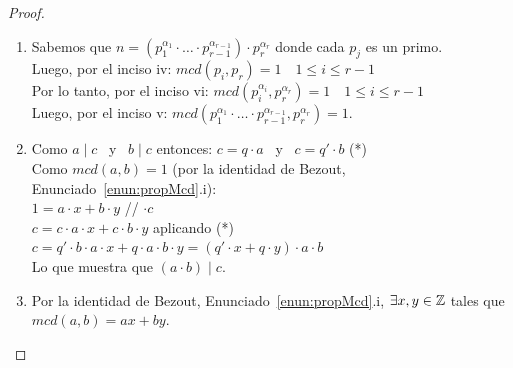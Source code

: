 \begin{proof}
\begin{enumerate}[label=\roman*)]
Sea p el menor factor de d. Es decir: $p \mid d$.\\
Luego (por el Enunciado~\ref{enun:propDivisibilidad}.v):\\
$p \mid p_{i}^{\alpha_{i}}$ \, y \, $p \mid p_{j}^{\alpha_{j}}$.\\
Entonces (por el Enunciado~\ref{enun:propDivprim}.ii):\\
$p \mid p_{i}$ \, o \, $p \mid  p_{i}^{\alpha_{i}-1} \quad y \quad p \mid p_{j}$ \, o \, $p \mid  p_{j}^{\alpha_{j}-1}$\\
Siguiendo el mismo razonamiento (y reuniendo todo):\\
$p \mid p_{i}$ \, o $\ldots$ o \, $p \mid  p_{i}$ \quad y \quad $p \mid p_{j}$ \, o $\ldots$ o \, $p \mid  p_{j}$\\
Es decir:\\
$p \mid p_{i} \quad y \quad p \mid  p_{j}$\\
Luego, hay un divisor común $p(p>1)$ de ambos $p_{i}, p_{j}$.\\
Eso contradice el hecho de que $mcd(p_{i}, p_{j})=1$.\\
Por tanto, nuestro supuesto es errado, es decir:\\
$mcd(p_{i}^{\alpha_{i}}, p_{j}^{\alpha_{j}})=1$.
\item Sabemos que $n=(p_{1}^{\alpha_{1}} \cdot \ldots \cdot p_{r-1}^{\alpha_{r-1}}) \cdot p_{r}^{\alpha_{r}}$ donde cada $p_{j}$ es un primo. \\
Luego, por el inciso iv: $mcd(p_{i}, p_{r})=1 \quad 1 \leq i \leq r-1$\\
Por lo tanto, por el inciso vi: $mcd(p_{i}^{\alpha_{i}}, p_{r}^{\alpha_{r}})=1 \quad 1 \leq i \leq r-1$\\
Luego, por el inciso v: $mcd(p_{1}^{\alpha_{1}} \cdot \ldots \cdot p_{r-1}^{\alpha_{r-1}}, p_{r}^{\alpha_{r}})=1$.
\item Como $a \mid c$ \, y \, $b \mid c$ entonces: $c=q \cdot a$ \, y \, $c=q' \cdot b$ \quad\quad (*) \\
Como $mcd(a, b)=1$ (por la identidad de Bezout,  Enunciado~\ref{enun:propMcd}.i): \\
$1=a \cdot x+b \cdot y$   \quad\quad // $\cdot c$ \\
$c=c \cdot a \cdot x+c \cdot b \cdot y$  \quad aplicando (*)\\
$c=q' \cdot b \cdot a \cdot x+q \cdot a \cdot b \cdot y=(q' \cdot x+q \cdot y) \cdot a \cdot b$\\
Lo que muestra que $(a \cdot b) \mid c$.
\item Por la identidad de Bezout, Enunciado~\ref{enun:propMcd}.i, $\exists x,y \in \mathbb{Z}$ tales que $mcd(a,b) = ax + by$. \\

\end{enumerate}
\end{proof}
